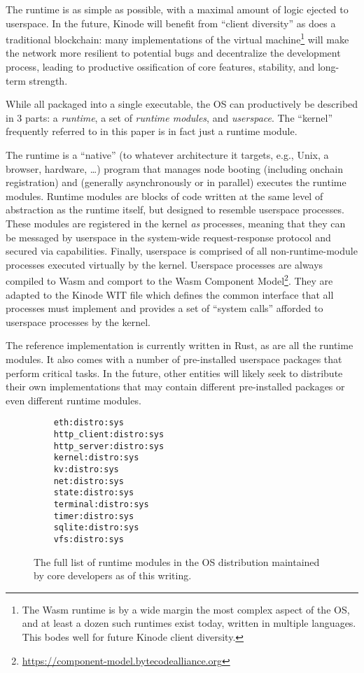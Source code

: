 \documentclass[runningheads]{llncs}
\begin{document}
The runtime is as simple as possible, with a maximal amount of logic ejected to userspace.
In the future, Kinode will benefit from ``client diversity'' as does a traditional blockchain: many implementations of the virtual machine\footnote{The Wasm runtime is by a wide margin the most complex aspect of the OS, and at least a dozen such runtimes exist today, written in multiple languages.
This bodes well for future Kinode client diversity.}
will make the network more resilient to potential bugs and decentralize the development process, leading to productive ossification of core features, stability, and long-term strength.

While all packaged into a single executable, the OS can productively be described in 3 parts: a \textit{runtime}, a set of \textit{runtime modules}, and \textit{userspace}.
The ``kernel'' frequently referred to in this paper is in fact just a runtime module.

The runtime is a ``native'' (to whatever architecture it targets, e.g., Unix, a browser, hardware, \ldots) program that manages node booting (including onchain registration) and (generally asynchronously or in parallel) executes the runtime modules.
Runtime modules are blocks of code written at the same level of abstraction as the runtime itself, but designed to resemble userspace processes.
These modules are registered in the kernel \textit{as} processes, meaning that they can be messaged by userspace in the system-wide request-response protocol and secured via capabilities.
Finally, userspace is comprised of all non-runtime-module processes executed virtually by the kernel.
Userspace processes are always compiled to Wasm and comport to the Wasm Component Model\footnote{\url{https://component-model.bytecodealliance.org}}.
They are adapted to the Kinode WIT file which defines the common interface that all processes must implement and provides a set of ``system calls'' afforded to userspace processes by the kernel.

The reference implementation is currently written in Rust, as are all the runtime modules.
It also comes with a number of pre-installed userspace packages that perform critical tasks.
In the future, other entities will likely seek to distribute their own implementations that may contain different pre-installed packages or even different runtime modules.

\begin{figure}
    \centering
    \begin{lstlisting}
    eth:distro:sys
    http_client:distro:sys
    http_server:distro:sys
    kernel:distro:sys
    kv:distro:sys
    net:distro:sys
    state:distro:sys
    terminal:distro:sys
    timer:distro:sys
    sqlite:distro:sys
    vfs:distro:sys
    \end{lstlisting}
    \caption{The full list of runtime modules in the OS distribution maintained by core developers as of this writing.}
    \label{fig:runtime modules list}
\end{figure}
\end{document}
